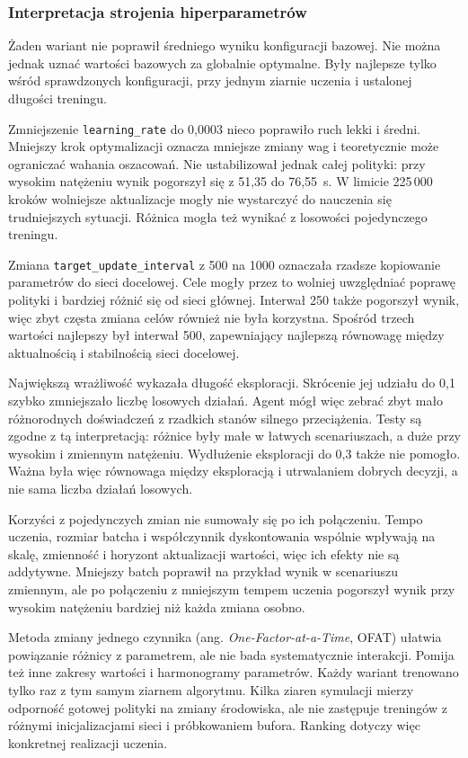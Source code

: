 \subsubsection{Interpretacja strojenia hiperparametrów}

Żaden wariant nie poprawił średniego wyniku konfiguracji bazowej. Nie można jednak uznać wartości bazowych za globalnie optymalne. Były najlepsze tylko wśród sprawdzonych konfiguracji, przy jednym ziarnie uczenia i ustalonej długości treningu.

Zmniejszenie \texttt{learning\_rate} do 0,0003 nieco poprawiło ruch lekki i średni. Mniejszy krok optymalizacji oznacza mniejsze zmiany wag i teoretycznie może ograniczać wahania oszacowań. Nie ustabilizował jednak całej polityki: przy wysokim natężeniu wynik pogorszył się z 51,35 do 76,55~s. W limicie 225\,000 kroków wolniejsze aktualizacje mogły nie wystarczyć do nauczenia się trudniejszych sytuacji. Różnica mogła też wynikać z losowości pojedynczego treningu.

Zmiana \texttt{target\_update\_interval} z 500 na 1000 oznaczała rzadsze kopiowanie parametrów do sieci docelowej. Cele mogły przez to wolniej uwzględniać poprawę polityki i bardziej różnić się od sieci głównej. Interwał 250 także pogorszył wynik, więc zbyt częsta zmiana celów również nie była korzystna. Spośród trzech wartości najlepszy był interwał 500, zapewniający najlepszą równowagę między aktualnością i stabilnością sieci docelowej.

Największą wrażliwość wykazała długość eksploracji. Skrócenie jej udziału do 0,1 szybko zmniejszało liczbę losowych działań. Agent mógł więc zebrać zbyt mało różnorodnych doświadczeń z rzadkich stanów silnego przeciążenia. Testy są zgodne z tą interpretacją: różnice były małe w łatwych scenariuszach, a duże przy wysokim i zmiennym natężeniu. Wydłużenie eksploracji do 0,3 także nie pomogło. Ważna była więc równowaga między eksploracją i utrwalaniem dobrych decyzji, a nie sama liczba działań losowych.

Korzyści z pojedynczych zmian nie sumowały się po ich połączeniu. Tempo uczenia, rozmiar batcha i współczynnik dyskontowania wspólnie wpływają na skalę, zmienność i horyzont aktualizacji wartości, więc ich efekty nie są addytywne. Mniejszy batch poprawił na przykład wynik w scenariuszu zmiennym, ale po połączeniu z mniejszym tempem uczenia pogorszył wynik przy wysokim natężeniu bardziej niż każda zmiana osobno.

Metoda zmiany jednego czynnika (ang. \textit{One-Factor-at-a-Time}, OFAT) ułatwia powiązanie różnicy z parametrem, ale nie bada systematycznie interakcji. Pomija też inne zakresy wartości i harmonogramy parametrów. Każdy wariant trenowano tylko raz z tym samym ziarnem algorytmu. Kilka ziaren symulacji mierzy odporność gotowej polityki na zmiany środowiska, ale nie zastępuje treningów z różnymi inicjalizacjami sieci i próbkowaniem bufora. Ranking dotyczy więc konkretnej realizacji uczenia.

